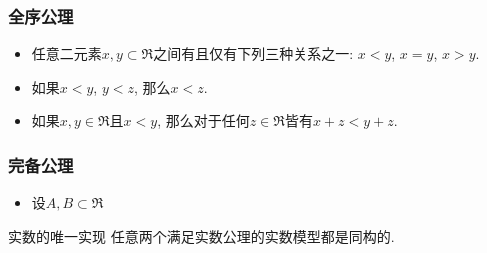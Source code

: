 \subsubsection{全序公理}
\begin{itemize}
\item 任意二元素$x,y\subset\mathfrak{R}$之间有且仅有下列三种关系之一: $x<y$, $x=y$, $x>y$.
\item 如果$x<y$, $y<z$, 那么$x<z$.
\item 如果$x,y\in\mathfrak{R}$且$x<y$, 那么对于任何$z\in\mathfrak{R}$皆有$x+z<y+z$.

\end{itemize}

\subsubsection{完备公理}
\begin{itemize}
\item 设$A,B\subset\mathfrak{R}$
\end{itemize}

\begin{theorem}{实数的唯一实现}
任意两个满足实数公理的实数模型都是同构的.
\end{theorem}